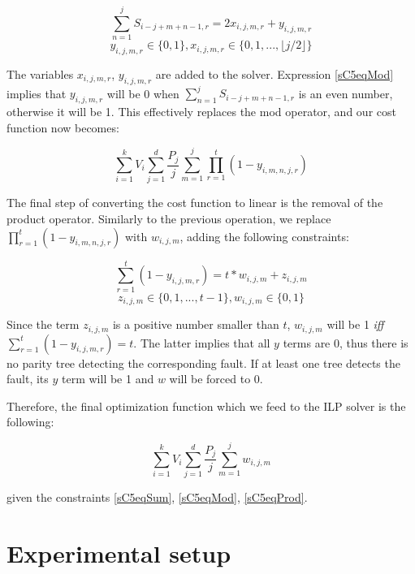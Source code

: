 \documentclass[12pt]{yalephd}
\begin{document}
\begin{equation}\label{sC5eqMod}
\sum_{n=1}^{j} S_{i-j+m+n-1,r} = 2x_{i,j,m,r} + y_{i,j,m,r}
\end{equation}
\begin{equation*}
y_{i,j,m,r} \in \{0,1\}, x_{i,j,m,r} \in \{0,1,...,\lfloor j/2 \rfloor\}
\end{equation*}

The variables $x_{i,j,m,r}$, $y_{i,j,m,r}$ are added to the solver. Expression \ref{sC5eqMod} implies that $y_{i,j,m,r}$ will be 0 when $\sum_{n=1}^{j} S_{i-j+m+n-1,r}$ is an even number, otherwise it will be 1. This effectively replaces the mod operator, and our cost function now becomes:

\begin{equation}
\sum_{i=1}^{k} V_i \sum_{j=1}^{d} \frac{P_j}{j} \sum_{m=1}^{j} \prod_{r=1}^{t} (1 - y_{i,m,n,j,r})
\end{equation}

The final step of converting the cost function to linear is the removal of the product operator. Similarly to the previous operation, we replace $\prod_{r=1}^{t} (1 - y_{i,m,n,j,r})$ with $w_{i,j,m}$, adding the following constraints:

\begin{equation}\label{sC5eqProd}
\sum_{r=1}^{t} (1 - y_{i,j,m,r}) = t*w_{i,j,m} + z_{i,j,m}
\end{equation}
\begin{equation*}
z_{i,j,m} \in \{0, 1, ..., t-1\}, w_{i,j,m} \in \{0, 1\}	
\end{equation*}

Since the term $z_{i,j,m}$ is a positive number smaller than $t$, $w_{i,j,m}$ will be 1 {\it iff} $\sum_{r=1}^{t} (1 - y_{i,j,m,r}) = t$. The latter implies that all $y$ terms are 0, thus there is no parity tree detecting the corresponding fault. If at least one tree detects the fault, its $y$ term will be 1 and $w$ will be forced to 0.

Therefore, the final optimization function which we feed to the ILP solver is the following:

\begin{equation}
\sum_{i=1}^{k} V_i \sum_{j=1}^{d} \frac{P_j}{j} \sum_{m=1}^{j} w_{i,j,m}
\end{equation}

\noindent given the constraints \ref{sC5eqSum}, \ref{sC5eqMod}, \ref{sC5eqProd}.


\section{Experimental setup}\label{sC5sExperimentalSetup}
\end{document}
